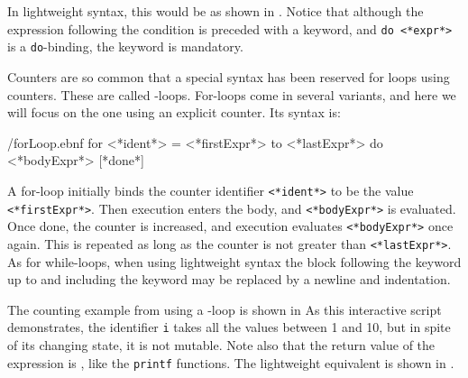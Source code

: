 \documentclass[fsharpnotes.tex]{subfiles}
\begin{document}
In lightweight syntax, this would be as shown in .
%
%
Notice that although the expression following the condition is preceded with a  keyword, and \lstinline[language=syntax]{do <*expr*>} is a \lstinline{do}-binding, the keyword  is mandatory. 

Counters are so common that a special syntax has been reserved for loops using counters. These are called -loops. For-loops come in several variants, and here we will focus on the one using an explicit counter. Its syntax is:
%
\begin{verbatimwrite}{\ebnf/forLoop.ebnf}
for <*ident*> = <*firstExpr*> to <*lastExpr*> do <*bodyExpr*> [*done*]
\end{verbatimwrite}
%
A for-loop initially binds the counter identifier \lstinline[language=syntax]{<*ident*>} to be the value \lstinline[language=syntax]{<*firstExpr*>}. Then execution enters the body, and \lstinline[language=syntax]{<*bodyExpr*>} is evaluated. Once done, the counter is increased, and execution evaluates \lstinline[language=syntax]{<*bodyExpr*>}  once again. This is repeated as long as the counter is not greater than \lstinline[language=syntax]{<*lastExpr*>}. As for while-loops, when using lightweight syntax the block following the  keyword up to and including the  keyword may be replaced by a newline and indentation.

The counting example from  using a -loop is shown in 
%
%
As this interactive script demonstrates, the identifier \lstinline!i! takes all the values between 1 and 10, but in spite of its changing state, it is not mutable. Note also that the return value of the  expression is \lexeme{()}, like the \lstinline!printf! functions. The lightweight equivalent is shown in .
%
%
\end{document}

